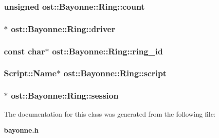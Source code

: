 \subsubsection[{count}]{\setlength{\rightskip}{0pt plus 5cm}unsigned {\bf ost::Bayonne::Ring::count}}\label{classost_1_1_bayonne_1_1_ring_af87fa07144ed547e4cb1c48141bc8d05}
\subsubsection[{driver}]{$\ast$ {\bf ost::Bayonne::Ring::driver}}\label{classost_1_1_bayonne_1_1_ring_a47b7f26dc925c478c27ecb7e0e124447}
\subsubsection[{ring\_\-id}]{\setlength{\rightskip}{0pt plus 5cm}const char$\ast$ {\bf ost::Bayonne::Ring::ring\_\-id}}\label{classost_1_1_bayonne_1_1_ring_ae5a7bfa3312bfee51ad236da0f4c33f8}
\subsubsection[{script}]{\setlength{\rightskip}{0pt plus 5cm}Script::Name$\ast$ {\bf ost::Bayonne::Ring::script}}\label{classost_1_1_bayonne_1_1_ring_a8f9462359f13fd0b065ebbe563104892}
\subsubsection[{session}]{$\ast$ {\bf ost::Bayonne::Ring::session}}\label{classost_1_1_bayonne_1_1_ring_a0041eb5e0d2a88b67e5bb3ba9d4596a8}


The documentation for this class was generated from the following file:\begin{DoxyCompactItemize}
\item 
{\bf bayonne.h}\end{DoxyCompactItemize}
